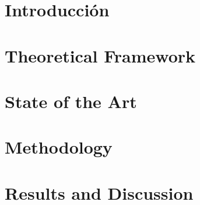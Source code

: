 \documentclass[12pt, twoside]{book}
\begin{document}
% 

% 

% 





\mainmatter

\newpage

\chapter{Introducción}
\label{chap:intro}


\chapter{Theoretical Framework}
\label{chap:theory}


\chapter{State of the Art}
\label{chap:state_of_art}


%

\chapter{Methodology}
\label{chap:methods}


\chapter{Results and Discussion}
\label{chap:results}

\end{document}
